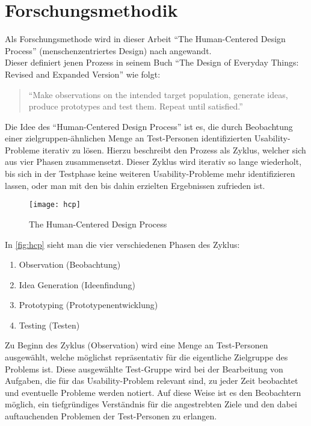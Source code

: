 \chapter{Forschungsmethodik}
Als Forschungsmethode wird in dieser Arbeit ``The Human-Centered Design Process'' (menschenzentriertes Design) nach \citeauthor{Norman13} angewandt. \\
Dieser definiert jenen Prozess in seinem Buch ``The Design of Everyday Things: Revised and Expanded Version'' wie folgt: \citep[Abbildung 6.2]{Norman13}

\begin{quote}
  ``Make observations on the intended target population, generate ideas, produce prototypes and test them.
  Repeat until satisfied.''
\end{quote}

\noindent
Die Idee des ``Human-Centered Design Process'' ist es, die durch Beobachtung einer zielgruppen-ähnlichen Menge an Test-Personen identifizierten Usability-Probleme iterativ zu lösen.
Hierzu beschreibt \citeauthor{Norman13} den Prozess als Zyklus, welcher sich aus vier Phasen zusammensetzt.
Dieser Zyklus wird iterativ so lange wiederholt, bis sich in der Testphase keine weiteren Usability-Probleme mehr identifizieren lassen, oder man mit den bis dahin erzielten Ergebnissen zufrieden ist. \\

\begin{figure}[h]
  \centering
  \texttt{[image: hcp]}
  \caption{The Human-Centered Design Process}
  \label{fig:hcp}
\end{figure}

\noindent
In \autoref{fig:hcp} sieht man die vier verschiedenen Phasen des Zyklus:
\begin{enumerate}
  \item Observation (Beobachtung) \label{itm:observation}
  \item Idea Generation (Ideenfindung) \label{itm:idea}
  \item Prototyping (Prototypenentwicklung) \label{itm:prototyping}
  \item Testing (Testen) \label{itm:testing}
\end{enumerate}

\noindent
Zu Beginn des Zyklus (Observation) wird eine Menge an Test-Personen ausgewählt, welche möglichst repräsentativ für die eigentliche Zielgruppe des Problems ist. 
Diese ausgewählte Test-Gruppe wird bei der Bearbeitung von Aufgaben, die für das Usability-Problem relevant sind, zu jeder Zeit beobachtet und eventuelle Probleme werden notiert. 
Auf diese Weise ist es den Beobachtern möglich, ein tiefgründiges Verständnis für die angestrebten Ziele und den dabei auftauchenden Problemen der Test-Personen zu erlangen. \\

